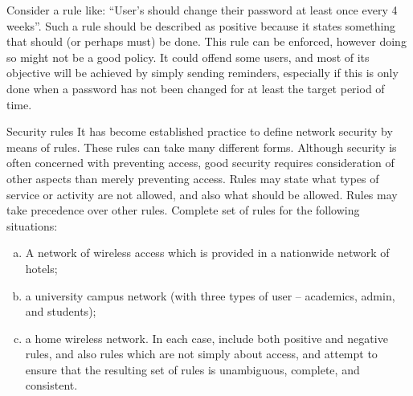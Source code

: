 Consider a rule like: ``User's should change their password at least once every 4 weeks''. Such a rule
should be described as positive because it states something that should (or perhaps must) be done.
This rule can be enforced, however doing so might not be a good policy. It could offend some users,
and most of its objective will be achieved by simply sending reminders, especially if this is only
done when a password has not been changed for at least the target period of time.

\begin{exercise}{Security rules}
It has become established practice to define network security by means of
rules. These rules can take many different forms. Although security is often concerned with preventing access, good security requires consideration of other aspects
than merely preventing access. Rules may state what types of service or activity are
not allowed, and also what should be allowed. Rules may take precedence over other
rules.
Complete set of rules for the following situations:
\begin{enumerate}[(a)]
\item A network of wireless access which is provided in a nationwide network of hotels;
\item a university campus network (with three types of user -- academics, admin, and
students);
\item a home wireless network.
In each case, include both positive and negative rules, and also rules which are 
not simply about access, and attempt to ensure that the resulting set of rules is unambiguous,
complete, and consistent.
\end{enumerate}
\end{exercise}

